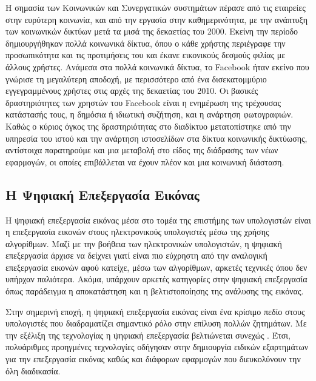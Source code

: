 \documentclass[
]{article}
\begin{document}
Η σημασία των Κοινωνικών και Συνεργατικών συστημάτων πέρασε από τις
εταιρείες στην ευρύτερη κοινωνία, και από την εργασία στην
καθημερινότητα, με την ανάπτυξη των κοινωνικών δικτύων μετά τα μισά της
δεκαετίας του 2000. Εκείνη την περίοδο δημιουργήθηκαν πολλά κοινωνικά
δίκτυα, όπου ο κάθε χρήστης περιέγραφε την προσωπικότητα και τις
προτιμήσεις του και έκανε εικονικούς δεσμούς φιλίας με άλλους χρήστες.
Ανάμεσα στα πολλά κοινωνικά δίκτυα, το Facebook ήταν εκείνο που γνώρισε
τη μεγαλύτερη αποδοχή, με περισσότερο από ένα δισεκατομμύριο
εγγεγραμμένους χρήστες στις αρχές της δεκαετίας του 2010. Οι βασικές
δραστηριότητες των χρηστών του Facebook είναι η ενημέρωση της τρέχουσας
κατάστασής τους, η δημόσια ή ιδιωτική συζήτηση, και η ανάρτηση
φωτογραφιών. Καθώς ο κύριος όγκος της δραστηριότητας στο διαδίκτυο
μετατοπίστηκε από την υπηρεσία του ιστού και την ανάρτηση ιστοσελίδων
στα δίκτυα κοινωνικής δικτύωσης, αντίστοιχα παρατηρούμε και μια μεταβολή
στο είδος της διάδρασης των νέων εφαρμογών, οι οποίες επιβάλλεται να
έχουν πλέον και μια κοινωνική διάσταση.

\hypertarget{ux3b7-ux3c8ux3b7ux3c6ux3b9ux3b1ux3baux3ae-ux3b5ux3c0ux3b5ux3beux3b5ux3c1ux3b3ux3b1ux3c3ux3afux3b1-ux3b5ux3b9ux3baux3ccux3bdux3b1ux3c2}{%
\subsection{Η Ψηφιακή Επεξεργασία
Εικόνας}\label{ux3b7-ux3c8ux3b7ux3c6ux3b9ux3b1ux3baux3ae-ux3b5ux3c0ux3b5ux3beux3b5ux3c1ux3b3ux3b1ux3c3ux3afux3b1-ux3b5ux3b9ux3baux3ccux3bdux3b1ux3c2}}

Η ψηφιακή επεξεργασία εικόνας μέσα στο τομέα της επιστήμης των
υπολογιστών είναι η επεξεργασία εικονών στους ηλεκτρονικούς υπολογιστές
μέσω της χρήσης αλγορίθμων. Μαζί με την βοήθεια των ηλεκτρονικών
υπολογιστών, η ψηφιακή επεξεργασία άρχισε να δείχνει γιατί είναι πιο
εύχρηστη από την αναλογική επεξεργασία εικονών αφού κατείχε, μέσω των
αλγορίθμων, αρκετές τεχνικές όπου δεν υπήρχαν παλιότερα. Ακόμα, υπάρχουν
αρκετές κατηγορίες στην ψηφιακή επεξεργασία όπως παράδειγμα η
αποκατάστηση και η βελτιστοποίησης της ανάλυσης της εικόνας.

Στην σημερινή εποχή, η ψηφιακή επεξεργασία εικόνας είναι ένα κρίσιμο
πεδίο στους υπολογιστές που διαδραματίζει σημαντικό ρόλο στην επίλυση
πολλών ζητημάτων. Με την εξέλιξη της τεχνολογίας η ψηφιακή επεξεργασία
βελτιώνεται συνεχώς . Έτσι, πολυάριθμες προηγμένες τεχνολογίες οδήγησαν
στην δημιουργία ειδικών εξαρτημάτων για την επεξεργασία εικόνας καθώς
και διάφορων εφαρμογών που διευκολύνουν την όλη διαδικασία.
\end{document}
